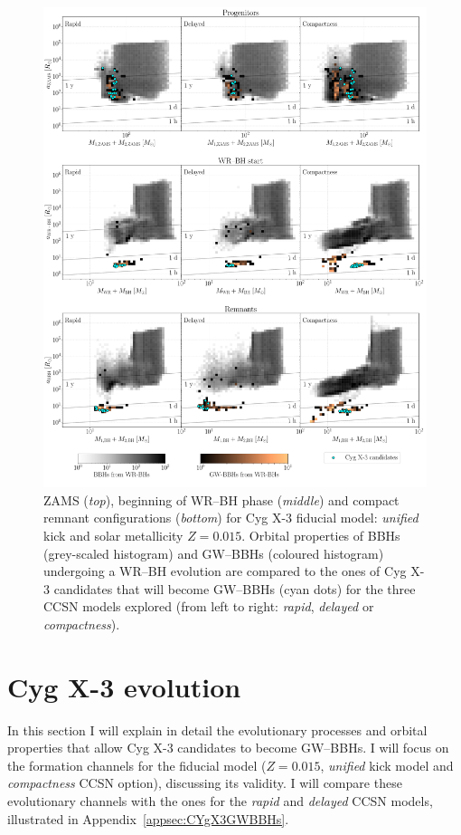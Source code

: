 \documentclass[a4paper,titlepage]{book}     	%
\begin{document}
\begin{figure}[h!]
	\centering
	\includegraphics[width=\textwidth]{./images/binary_unified265_015.pdf}
	\caption{ZAMS (\emph{top}), beginning of WR--BH phase (\emph{middle}) and compact remnant configurations (\emph{bottom}) for Cyg X-3 fiducial model: \emph{unified} kick and solar metallicity $Z=0.015$. Orbital properties of BBHs (grey-scaled histogram) and GW--BBHs (coloured histogram) undergoing a WR--BH evolution are compared to the ones of Cyg X-3 candidates that will become GW--BBHs (cyan dots) for the three CCSN models explored (from left to right: \emph{rapid}, \emph{delayed} or \emph{compactness}).}\label{fig:resultskickunified265Z015evolutionCygX3}
\end{figure}





\clearpage

\section{Cyg X-3 evolution}\label{sec:resultsCygX3evo}
In this section I will explain in detail the evolutionary processes and orbital properties that allow Cyg X-3 candidates to become GW--BBHs. I will focus on the formation channels for the fiducial model ($Z=0.015$, \emph{unified} kick model and \emph{compactness} CCSN option), discussing its validity. I will compare these evolutionary channels with the ones for the \emph{rapid} and \emph{delayed} CCSN models, illustrated in Appendix~\ref{appsec:CYgX3GWBBHs}.
\end{document}
